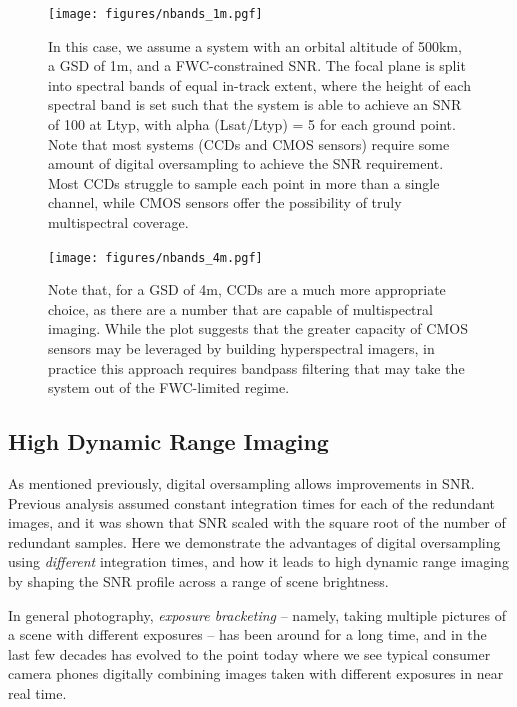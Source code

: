 \documentclass[]{spieman}  %
\begin{document}
\begin{figure}
  \centering
  \texttt{[image: figures/nbands\_1m.pgf]}
  \caption{In this case, we assume a system with an orbital altitude of 500km, a GSD of 1m, and a FWC-constrained SNR. The focal plane is split into spectral bands of equal in-track extent, where the height of each spectral band is set such that the system is able to achieve an SNR of 100 at Ltyp, with alpha (Lsat/Ltyp) = 5 for each ground point. Note that most systems (CCDs and CMOS sensors) require some amount of digital oversampling to achieve the SNR requirement. Most CCDs struggle to sample each point in more than a single channel, while CMOS sensors offer the possibility of truly multispectral coverage. \label{fig:nbands_1m}}
\end{figure}

\begin{figure}
  \centering
  \texttt{[image: figures/nbands\_4m.pgf]}
  \caption{Note that, for a GSD of 4m, CCDs are a much more appropriate choice, as there are a number that are capable of multispectral imaging. While the plot suggests that the greater capacity of CMOS sensors may be leveraged by building hyperspectral imagers, in practice this approach requires bandpass filtering that may take the system out of the FWC-limited regime.
  \label{fig:nbands_4m}}
\end{figure}


\subsection{High Dynamic Range Imaging}
\label{sec:hdr}

As mentioned previously, digital oversampling allows improvements in SNR. Previous analysis assumed constant integration times for each of the redundant images, and it was shown that SNR scaled with the square root of the number of redundant samples. Here we demonstrate the advantages of digital oversampling using \emph{different} integration times, and how it leads to high dynamic range imaging by shaping the SNR profile across a range of scene brightness.

In general photography, \emph{exposure bracketing} -- namely, taking multiple pictures of a scene with different exposures -- has been around for a long time, and in the last few decades has evolved to the point today where we see typical consumer camera phones digitally combining images taken with different exposures in near real time.
\end{document}
